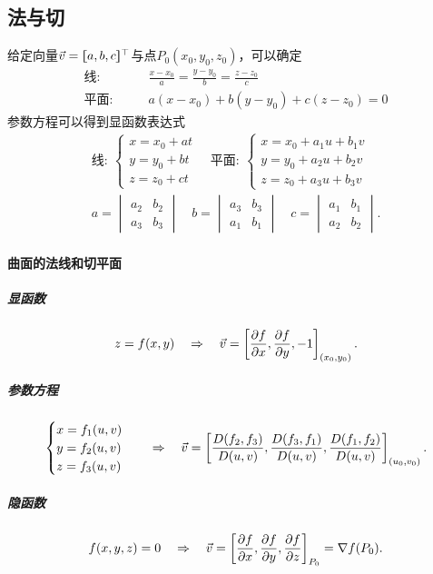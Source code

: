 \subsection{法与切}
给定向量$\vec v=\lfloor\hspace{-4.7 pt}\lceil a,b,c\rceil\hspace{-4.7 pt}\rfloor^\top$与点$P_0(x_0,y_0,z_0)$，可以确定
\begin{align*}
	\text{线}:   & \qquad \frac{x-x_0}a=\frac{y-y_0}b=\frac{z-z_0}c \\
	\text{平面}: & \qquad a(x-x_0)+b(y-y_0)+c(z-z_0)=0
\end{align*}
参数方程可以得到显函数表达式
\begin{gather*}
	\text{线}:~
	\begin{cases}
		x=x_0+at \\[-1ex]
		y=y_0+bt \\[-1ex]
		z=z_0+ct
	\end{cases}
	\quad
	\text{平面}:~
	\begin{cases}
		x=x_0+a_1u+b_1v \\[-1ex]
		y=y_0+a_2u+b_2v \\[-1ex]
		z=z_0+a_3u+b_3v
	\end{cases}
	\\
	a=
	\begin{vmatrix}
		a_2 & b_2 \\
		a_3 & b_3
	\end{vmatrix}\quad b=
	\begin{vmatrix}
		a_3 & b_3 \\
		a_1 & b_1
	\end{vmatrix}\quad c=
	\begin{vmatrix}
		a_1 & b_1 \\
		a_2 & b_2
	\end{vmatrix}.
\end{gather*}
\paragraph{曲面的法线和切平面}
\subparagraph{显函数}
\[
	z=f(x,y)\thus\vec v=\left[\pv fx,\pv fy,-1\right]_{(x_0,y_0)}.
\]
\subparagraph{参数方程}
\begin{align*}
	\begin{cases}
		x=f_1(u,v) \\
		y=f_2(u,v) \\
		z=f_3(u,v)
	\end{cases}
	\quad\Rightarrow\quad\vec v=\left[\frac{D(f_2,f_3)}{D(u,v)},\frac{D(f_3,f_1)}{D(u,v)},\frac{D(f_1,f_2)}{D(u,v)}\right]_{(u_0,v_0)}.
\end{align*}
\subparagraph{隐函数}
\[
	f(x,y,z)=0\thus\vec v=\fkh{\pv fx,\pv fy,\pv fz}_{P_0}=\nabla f(P_0).
\]
